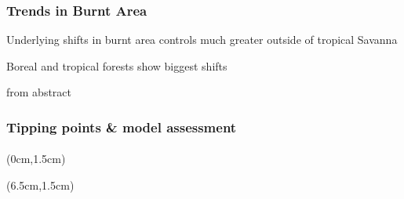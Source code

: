 \begin{frame}
    \frametitle{Trends in Burnt Area}
	\begin{itemize}
		\large{
			\item Underlying shifts in burnt area controls much greater outside of tropical Savanna
			\item Boreal and tropical forests show biggest shifts
            \item from abstract
		}
    \end{itemize}
\end{frame}

\addtocounter{framenumber}{-1}
\begin{frame}
	\frametitle{Tipping points \& model assessment}
	\framesubtitle{}
	
	\begin{textblock*}{12cm}(0cm,1.5cm)
	\end{textblock*}
	\begin{textblock*}{12cm}(6.5cm,1.5cm)
	\end{textblock*}
\end{frame}

